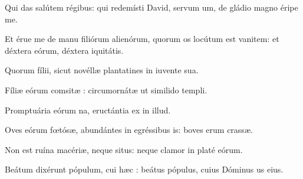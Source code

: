 \item {}

\item Qui das salútem régibus:\pscross{} qui redemísti David, servum um,\psstar{} de gládio magno éripe me.

\item Et érue me de manu filiórum alienórum,\pscross{} quorum os locútum est vanitem:\psstar{} et déxtera eórum, déxtera iquitátis.

\item Quorum fílii, sicut novéllæ plantatines\psstar{} in iuvente sua.

\item Fíliæ eórum comsitæ :\psstar{} circumornátæ ut similido templi.

\item Promptuária eórum na,\psstar{} eructántia ex  in illud.

\item Oves eórum fœtósæ, abundántes in egréssibus is:\psstar{} boves erum crassæ.

\item Non est ruína macériæ, neque situs:\psstar{} neque clamor in platé eórum.

\item Beátum dixérunt pópulum, cui hæc :\psstar{} beátus pópulus, cuius Dóminus us eius.
